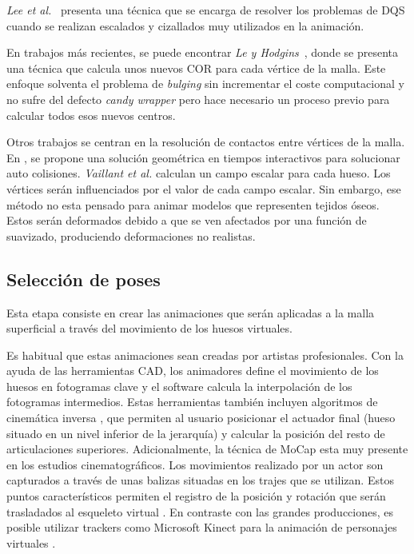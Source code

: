 \emph{Lee et al.}~\cite{Lee2013} presenta una técnica que se encarga de resolver los problemas de \ac{DQS} cuando se realizan escalados y cizallados muy utilizados en la animación.

En trabajos más recientes, se puede encontrar \emph{Le y Hodgins}~\cite{le2016real}, donde se presenta una técnica que calcula unos nuevos \ac{COR} para cada vértice de la malla. Este enfoque solventa el problema de \emph{bulging} sin incrementar el coste computacional y no sufre del defecto \emph{candy wrapper} pero hace necesario un proceso previo para calcular todos esos nuevos centros.

%
%
Otros trabajos se centran en la resolución de contactos entre vértices de la malla. En \cite{Vaillant:2014}, se propone una solución geométrica en tiempos interactivos para solucionar auto colisiones. \emph{Vaillant et al.} calculan un campo escalar para cada hueso. Los vértices serán influenciados por el valor de cada campo escalar. Sin embargo, ese método no esta pensado para animar modelos  que representen tejidos óseos. Estos serán deformados debido a que se ven afectados por una función de suavizado, produciendo deformaciones no realistas. %



\subsection{Selección de poses} 

Esta etapa consiste en crear las animaciones que serán aplicadas a la malla superficial a través del movimiento de los huesos virtuales.   

Es habitual que estas animaciones sean creadas por artistas profesionales. Con la ayuda de las herramientas \ac{CAD}, los animadores define el movimiento de los huesos en fotogramas clave y el software calcula la interpolación de los fotogramas intermedios. Estas herramientas también incluyen algoritmos de cinemática inversa \cite{Shi:2007}, que permiten al usuario posicionar el actuador final (hueso situado en un nivel inferior de la jerarquía) y calcular la posición del resto de articulaciones superiores. 
Adicionalmente, la técnica de \ac{MoCap} esta muy presente en los estudios cinematográficos. Los movimientos realizado por un actor son capturados a través de unas balizas situadas en los trajes que se utilizan. Estos puntos característicos permiten el registro de la posición y rotación que serán trasladados al esqueleto virtual \cite{Menache:1999}. En contraste con las grandes producciones, es posible utilizar \ac{tracker}s como Microsoft Kinect para la animación de personajes virtuales \cite{Liu:2018}.


